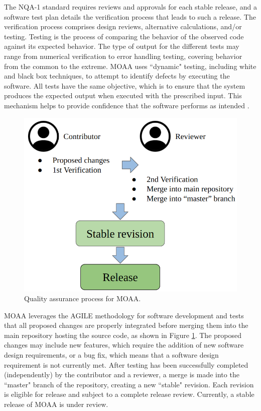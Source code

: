 The NQA-1 standard requires reviews and approvals for each stable release, and a software test plan details the verification process that leads to such a release.
The verification process comprises design reviews, alternative calculations, and/or testing.
Testing is the process of comparing the behavior of the observed code against its expected behavior.
The type of output for the different tests may range from numerical verification to error handling testing, covering behavior from the common to the extreme.
MOAA uses ``dynamic" testing, including white and black box techniques, to attempt to identify defects by executing the software.
All tests have the same objective, which is to ensure that the system produces the expected output when executed with the prescribed input.
This mechanism helps to provide confidence that the software performs as intended \cite{testing}.

\begin{figure}[htbp!]
  \begin{center}
    \includegraphics[scale=0.30]{figures/version-control}
  \end{center}
  \caption{Quality assurance process for MOAA.}
  \label{fig:sqa}
\end{figure}

MOAA leverages the AGILE methodology for software development and tests that all proposed changes are properly integrated before merging them into the main repository hosting the source code, as shown in Figure \ref{fig:sqa}.
The proposed changes may include new features, which require the addition of new software design requirements, or a bug fix, which means that a software design requirement is not currently met.
After testing has been successfully completed (independently) by the contributor and a reviewer, a merge is made into the ``master" branch of the repository, creating a new ``stable" revision.
Each revision is eligible for release and subject to a complete release review.
Currently, a stable release of MOAA is under review.


